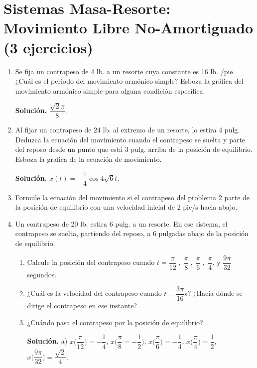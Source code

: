 \documentclass[letterpaper,10pt]{memoir}
\begin{document}
\titulo

\section*{Sistemas Masa-Resorte: Movimiento Libre No-Amortiguado (3 ejercicios)} %
\begin{enumerate}
	\item Se fija un contrapeso de 4 lb. a un resorte cuya constante es 16 lb. /pie. ¿Cuál es el periodo del movimiento armónico simple? Esboza la gráfica del movimiento armónico simple para alguna condición específica.
		\begin{flushright}
			\textbf{Solución.} \(\dfrac{\sqrt{2} \pi}{8}\).
		\end{flushright}
	\item Al fijar un contrapeso de 24 lb. al extremo de un resorte, lo estira 4 pulg. Deduzca la ecuación del movimiento cuando el contrapeso se suelta y parte del reposo desde un punto que está 3 pulg. arriba de la posición de equilibrio. Esboza la grafica de la ecuación de movimiento.
		\begin{flushright}
			\textbf{Solución.} \(x(t) =- \dfrac{1}{4} \cos 4 \sqrt{6} t\).
		\end{flushright}
	\item Formule la ecuación del movimiento si el contrapeso del problema 2 parte de la posición de equilibrio con una velocidad inicial de 2 pie/s hacia abajo.
	\item Un contrapeso de 20 lb. estira 6 pulg. a un resorte. En ese sistema, el contrapeso se suelta, partiendo del reposo, a 6 pulgadas abajo de la posición de equilibrio.
		\begin{enumerate}
			\item Calcule la posición del contrapeso cuando \(t= \dfrac{\pi}{12} \;,\; \dfrac{\pi}{8} \;,\; \dfrac{\pi}{6} \;,\; \dfrac{\pi}{4}\), y \(\dfrac{9 \pi}{32}\) segundos.
			\item ¿Cuál es la velocidad del contrapeso cuando \(t= \dfrac{3 \pi}{16}s\)? ¿Hacia dónde se dirige el contrapeso en ese instante?
			\item ¿Cuándo pasa el contrapeso por la posición de equilibrio?
				\begin{flushright}
					\textbf{Solución.} a) \hspace{5mm}\(x \Bigg(\dfrac{\pi}{12}\Bigg) =-\dfrac{1}{4}\), \(x \Bigg(\dfrac{\pi}{8} =- \dfrac{1}{2}\Bigg)\), \(x \Bigg(\dfrac{\pi}{6}\Bigg) = -\dfrac{1}{4}\), \(x \Bigg(\dfrac{\pi}{4}\Bigg) = \dfrac{1}{2}\), \(x \Bigg(\dfrac{9 \pi}{32}\Bigg) = \dfrac{\sqrt{2}}{4}\).\\

\end{flushright}
\end{enumerate}
\end{enumerate}
\end{document}
